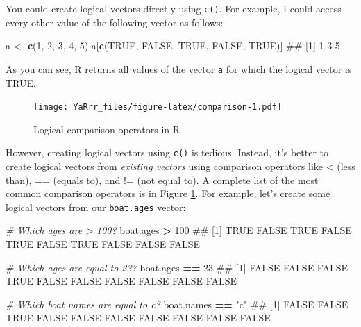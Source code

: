 \documentclass[]{book}
\newenvironment{Shaded}{\begin{snugshade}}{\end{snugshade}}
\newcommand{\KeywordTok}[1]{\textcolor[rgb]{0.13,0.29,0.53}{\textbf{#1}}}
\newcommand{\DecValTok}[1]{\textcolor[rgb]{0.00,0.00,0.81}{#1}}
\newcommand{\StringTok}[1]{\textcolor[rgb]{0.31,0.60,0.02}{#1}}
\newcommand{\CommentTok}[1]{\textcolor[rgb]{0.56,0.35,0.01}{\textit{#1}}}
\newcommand{\OtherTok}[1]{\textcolor[rgb]{0.56,0.35,0.01}{#1}}
\newcommand{\OperatorTok}[1]{\textcolor[rgb]{0.81,0.36,0.00}{\textbf{#1}}}
\newcommand{\NormalTok}[1]{#1}
\theoremstyle{definition}
\theoremstyle{definition}
\theoremstyle{remark}
\begin{document}
You could create logical vectors directly using \texttt{c()}. For
example, I could access every other value of the following vector as
follows:

\begin{Shaded}
\begin{Highlighting}[]
\NormalTok{a <-}\StringTok{ }\KeywordTok{c}\NormalTok{(}\DecValTok{1}\NormalTok{, }\DecValTok{2}\NormalTok{, }\DecValTok{3}\NormalTok{, }\DecValTok{4}\NormalTok{, }\DecValTok{5}\NormalTok{)}
\NormalTok{a[}\KeywordTok{c}\NormalTok{(}\OtherTok{TRUE}\NormalTok{, }\OtherTok{FALSE}\NormalTok{, }\OtherTok{TRUE}\NormalTok{, }\OtherTok{FALSE}\NormalTok{, }\OtherTok{TRUE}\NormalTok{)]}
\NormalTok{## [1] 1 3 5}
\end{Highlighting}
\end{Shaded}

As you can see, R returns all values of the vector \texttt{a} for which
the logical vector is TRUE.

\begin{figure}
\centering
\texttt{[image: YaRrr\_files/figure-latex/comparison-1.pdf]}
\caption{\label{fig:comparison}Logical comparison operators in R}
\end{figure}

However, creating logical vectors using \texttt{c()} is tedious.
Instead, it's better to create logical vectors from \emph{existing
vectors} using comparison operators like \textless{} (less than), ==
(equals to), and != (not equal to). A complete list of the most common
comparison operators is in Figure \ref{fig:comparison}. For example,
let's create some logical vectors from our \texttt{boat.ages} vector:

\begin{Shaded}
\begin{Highlighting}[]
\CommentTok{# Which ages are > 100?}
\NormalTok{boat.ages }\OperatorTok{>}\StringTok{ }\DecValTok{100}
\NormalTok{##  [1]  TRUE FALSE  TRUE FALSE  TRUE FALSE  TRUE FALSE FALSE FALSE}

\CommentTok{# Which ages are equal to 23?}
\NormalTok{boat.ages }\OperatorTok{==}\StringTok{ }\DecValTok{23}
\NormalTok{##  [1] FALSE FALSE FALSE  TRUE FALSE FALSE FALSE FALSE FALSE FALSE}

\CommentTok{# Which boat names are equal to c?}
\NormalTok{boat.names }\OperatorTok{==}\StringTok{ "c"}
\NormalTok{##  [1] FALSE FALSE  TRUE FALSE FALSE FALSE FALSE FALSE FALSE FALSE}
\end{Highlighting}
\end{Shaded}
\end{document}
